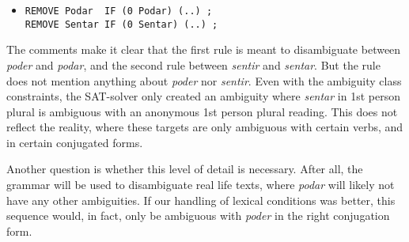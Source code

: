 




\begin{itemize}
\item[]\begin{verbatim}
REMOVE Podar  IF (0 Podar) (..) ;
REMOVE Sentar IF (0 Sentar) (..) ;

\end{verbatim}
\end{itemize}

The comments make it clear that the first rule is meant to disambiguate between \emph{poder} and \emph{podar}, and the second rule between \emph{sentir} and \emph{sentar}. But the rule does not mention anything about \emph{poder} nor \emph{sentir}.
Even with the ambiguity class constraints, the SAT-solver only created an ambiguity where \emph{sentar} in 1st person plural is ambiguous with an anonymous 1st person plural reading.
This does not reflect the reality, where these targets are only ambiguous with certain verbs, and in certain conjugated forms.

Another question is whether this level of detail is necessary. 
After all, the grammar will be used to disambiguate real life texts, where \emph{podar} will likely not have any other ambiguities. 
If our handling of lexical conditions was better, this sequence would, in fact, only be ambiguous with \emph{poder} in the right conjugation form.



